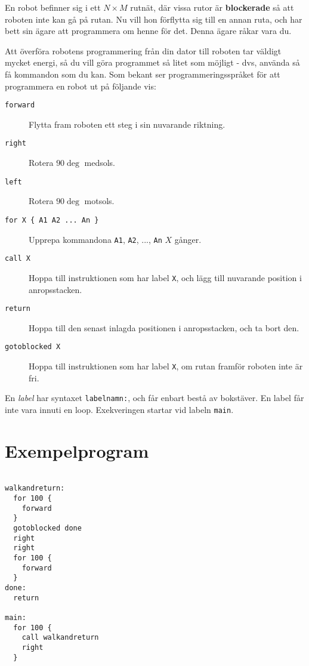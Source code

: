 
En robot befinner sig i ett $N \times M$ rutnät, där vissa rutor är \textbf{blockerade} så att roboten inte kan gå på rutan. Nu vill hon förflytta sig till en annan ruta, och har bett sin ägare att programmera om henne för det. Denna ägare råkar vara du.

Att överföra robotens programmering från din dator till roboten tar väldigt mycket energi, så du vill göra programmet så litet som möjligt - dvs, använda så få kommandon som du kan.
Som bekant ser programmeringsspråket för att programmera en robot ut på följande vis:

\begin{description}
  \item[\texttt{forward}] Flytta fram roboten ett steg i sin nuvarande riktning.
  \item[\texttt{right}] Rotera $90\deg$ medsols.
  \item[\texttt{left}] Rotera $90\deg$ motsols.
  \item[\texttt{for X \{ A1 A2 ... An \}}] Upprepa kommandona \texttt{A1}, \texttt{A2}, ..., \texttt{An} $X$ gånger.
  \item[\texttt{call X}] Hoppa till instruktionen som har label \texttt{X}, och lägg till nuvarande position i anropsstacken.
  \item[\texttt{return}] Hoppa till den senast inlagda positionen i anropsstacken, och ta bort den.
  \item[\texttt{gotoblocked X}] Hoppa till instruktionen som har label \texttt{X}, om rutan framför roboten inte är fri.
\end{description}

En \emph{label} har syntaxet \texttt{labelnamn:}, och får enbart bestå av bokstäver. En label får inte vara innuti en loop. Exekveringen startar vid labeln \texttt{main}.

\section*{Exempelprogram}

\begin{verbatim}

walkandreturn:
  for 100 {
    forward
  }
  gotoblocked done
  right
  right
  for 100 {
    forward
  }
done:
  return

main:
  for 100 {
    call walkandreturn
    right
  }
\end{verbatim}

